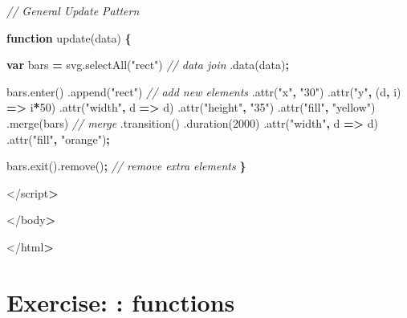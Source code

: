 \documentclass[openany]{book}
\newenvironment{Shaded}{\begin{snugshade}}{\end{snugshade}}
\newcommand{\AttributeTok}[1]{\textcolor[rgb]{0.77,0.63,0.00}{#1}}
\newcommand{\CommentTok}[1]{\textcolor[rgb]{0.56,0.35,0.01}{\textit{#1}}}
\newcommand{\DecValTok}[1]{\textcolor[rgb]{0.00,0.00,0.81}{#1}}
\newcommand{\KeywordTok}[1]{\textcolor[rgb]{0.13,0.29,0.53}{\textbf{#1}}}
\newcommand{\NormalTok}[1]{#1}
\newcommand{\OperatorTok}[1]{\textcolor[rgb]{0.81,0.36,0.00}{\textbf{#1}}}
\newcommand{\StringTok}[1]{\textcolor[rgb]{0.31,0.60,0.02}{#1}}
\newcommand{\VariableTok}[1]{\textcolor[rgb]{0.00,0.00,0.00}{#1}}
\begin{document}
\begin{Shaded}
\begin{Highlighting}[]
\CommentTok{// General Update Pattern}

\KeywordTok{function} \AttributeTok{update}\NormalTok{(data) }\OperatorTok{\{}

  \KeywordTok{var}\NormalTok{ bars }\OperatorTok{=} \VariableTok{svg}\NormalTok{.}\AttributeTok{selectAll}\NormalTok{(}\StringTok{"rect"}\NormalTok{)    }\CommentTok{// data join}
\NormalTok{    .}\AttributeTok{data}\NormalTok{(data)}\OperatorTok{;}

    \VariableTok{bars}\NormalTok{.}\AttributeTok{enter}\NormalTok{()}
\NormalTok{      .}\AttributeTok{append}\NormalTok{(}\StringTok{"rect"}\NormalTok{)    }\CommentTok{// add new elements}
\NormalTok{        .}\AttributeTok{attr}\NormalTok{(}\StringTok{"x"}\OperatorTok{,} \StringTok{"30"}\NormalTok{)}
\NormalTok{        .}\AttributeTok{attr}\NormalTok{(}\StringTok{"y"}\OperatorTok{,}\NormalTok{ (d}\OperatorTok{,}\NormalTok{ i) }\OperatorTok{=>}\NormalTok{ i}\OperatorTok{*}\DecValTok{50}\NormalTok{)}
\NormalTok{        .}\AttributeTok{attr}\NormalTok{(}\StringTok{"width"}\OperatorTok{,}\NormalTok{ d }\OperatorTok{=>}\NormalTok{ d)}
\NormalTok{        .}\AttributeTok{attr}\NormalTok{(}\StringTok{"height"}\OperatorTok{,} \StringTok{"35"}\NormalTok{)}
\NormalTok{        .}\AttributeTok{attr}\NormalTok{(}\StringTok{"fill"}\OperatorTok{,} \StringTok{"yellow"}\NormalTok{)}
\NormalTok{      .}\AttributeTok{merge}\NormalTok{(bars)    }\CommentTok{// merge}
\NormalTok{        .}\AttributeTok{transition}\NormalTok{()}
\NormalTok{        .}\AttributeTok{duration}\NormalTok{(}\DecValTok{2000}\NormalTok{)}
\NormalTok{        .}\AttributeTok{attr}\NormalTok{(}\StringTok{"width"}\OperatorTok{,}\NormalTok{ d }\OperatorTok{=>}\NormalTok{ d)}
\NormalTok{        .}\AttributeTok{attr}\NormalTok{(}\StringTok{"fill"}\OperatorTok{,} \StringTok{"orange"}\NormalTok{)}\OperatorTok{;}

    \VariableTok{bars}\NormalTok{.}\AttributeTok{exit}\NormalTok{().}\AttributeTok{remove}\NormalTok{()}\OperatorTok{;}    \CommentTok{// remove extra elements}
    \OperatorTok{\}}

\NormalTok{    </script}\OperatorTok{>}

\NormalTok{  </body}\OperatorTok{>}

\NormalTok{</html}\OperatorTok{>}
\end{Highlighting}
\end{Shaded}

\hypertarget{exercise-functions}{%
\section{Exercise: : functions}\label{exercise-functions}}
\end{document}
